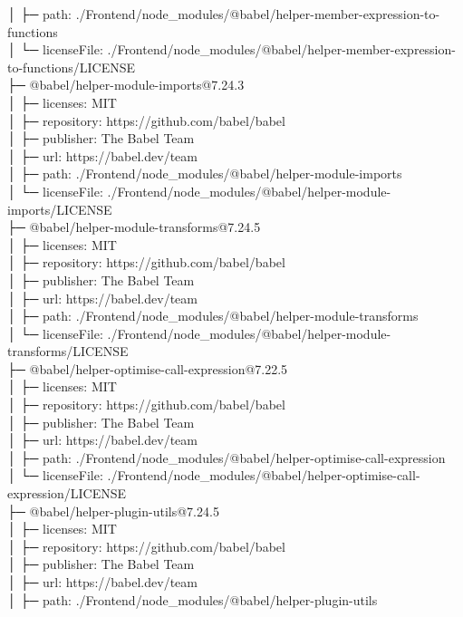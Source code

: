 │  ├─ path: ./Frontend/node\_modules/@babel/helper-member-expression-to-functions\\
│  └─ licenseFile: ./Frontend/node\_modules/@babel/helper-member-expression-to-functions/LICENSE\\
├─ @babel/helper-module-imports@7.24.3\\
│  ├─ licenses: MIT\\
│  ├─ repository: https://github.com/babel/babel\\
│  ├─ publisher: The Babel Team\\
│  ├─ url: https://babel.dev/team\\
│  ├─ path: ./Frontend/node\_modules/@babel/helper-module-imports\\
│  └─ licenseFile: ./Frontend/node\_modules/@babel/helper-module-imports/LICENSE\\
├─ @babel/helper-module-transforms@7.24.5\\
│  ├─ licenses: MIT\\
│  ├─ repository: https://github.com/babel/babel\\
│  ├─ publisher: The Babel Team\\
│  ├─ url: https://babel.dev/team\\
│  ├─ path: ./Frontend/node\_modules/@babel/helper-module-transforms\\
│  └─ licenseFile: ./Frontend/node\_modules/@babel/helper-module-transforms/LICENSE\\
├─ @babel/helper-optimise-call-expression@7.22.5\\
│  ├─ licenses: MIT\\
│  ├─ repository: https://github.com/babel/babel\\
│  ├─ publisher: The Babel Team\\
│  ├─ url: https://babel.dev/team\\
│  ├─ path: ./Frontend/node\_modules/@babel/helper-optimise-call-expression\\
│  └─ licenseFile: ./Frontend/node\_modules/@babel/helper-optimise-call-expression/LICENSE\\
├─ @babel/helper-plugin-utils@7.24.5\\
│  ├─ licenses: MIT\\
│  ├─ repository: https://github.com/babel/babel\\
│  ├─ publisher: The Babel Team\\
│  ├─ url: https://babel.dev/team\\
│  ├─ path: ./Frontend/node\_modules/@babel/helper-plugin-utils\\
